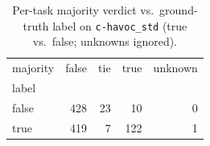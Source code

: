 \begin{table}[t]
  \centering
  \caption{Per-task majority verdict vs.\ ground-truth label on \texttt{c-havoc_std} (true vs.\ false; unknowns ignored).}
  \label{tab:majority-c-havoc_std}
\begin{tabular}{lrrrr}
\toprule
majority & false & tie & true & unknown \\
label &  &  &  &  \\
\midrule
false & 428 & 23 & 10 & 0 \\
true & 419 & 7 & 122 & 1 \\
\bottomrule
\end{tabular}
\end{table}
